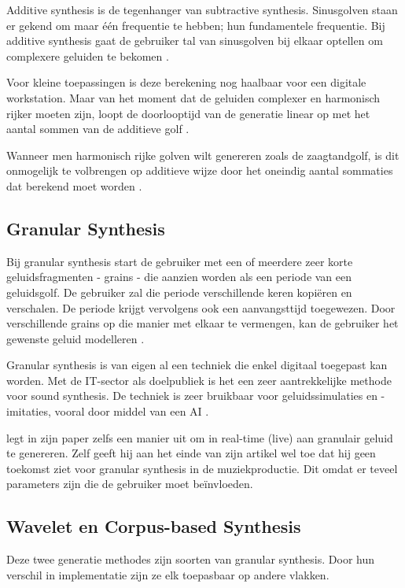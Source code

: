 Additive synthesis is de tegenhanger van subtractive synthesis. Sinusgolven staan er gekend om maar één frequentie te hebben; hun fundamentele frequentie. Bij additive synthesis gaat de gebruiker tal van sinusgolven bij elkaar optellen om complexere geluiden te bekomen \autocite{additive}.

Voor kleine toepassingen is deze berekening nog haalbaar voor een digitale workstation. Maar van het moment dat de geluiden complexer en harmonisch rijker moeten zijn, loopt de doorlooptijd van de generatie linear op met het aantal sommen van de additieve golf \autocite{additive}.

Wanneer men harmonisch rijke golven wilt genereren zoals de zaagtandgolf, is dit onmogelijk te volbrengen op additieve wijze door het oneindig aantal sommaties dat berekend moet worden \autocite{harmonics}.

\subsection{Granular Synthesis}

Bij granular synthesis start de gebruiker met een of meerdere zeer korte geluidsfragmenten - grains - die aanzien worden als een periode van een geluidsgolf. De gebruiker zal die periode verschillende keren kopiëren en verschalen. De periode krijgt vervolgens ook een aanvangsttijd toegewezen. Door verschillende grains op die manier met elkaar te vermengen, kan de gebruiker het gewenste geluid modelleren \autocite{granular}.

Granular synthesis is van eigen al een techniek die enkel digitaal toegepast kan worden. Met de IT-sector als doelpubliek is het een zeer aantrekkelijke methode voor sound synthesis. De techniek is zeer bruikbaar voor geluidssimulaties en -imitaties, vooral door middel van een AI \autocite{granular}.

\textcite{granular} legt in zijn paper zelfs een manier uit om in real-time (live) aan granulair geluid te genereren. Zelf geeft hij aan het einde van zijn artikel wel toe dat hij geen toekomst ziet voor granular synthesis in de muziekproductie. Dit omdat er teveel parameters zijn die de gebruiker moet beïnvloeden.

\subsection{Wavelet en Corpus-based Synthesis}

Deze twee generatie methodes zijn soorten van granular synthesis. Door hun verschil in implementatie zijn ze elk toepasbaar op andere vlakken.

